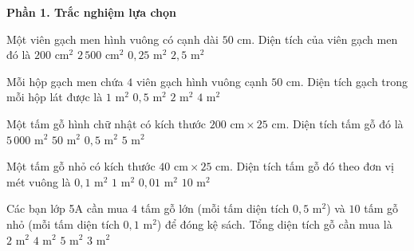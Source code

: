 \textbf{Phần 1. Trắc nghiệm lựa chọn}

\begin{ex} %
Một viên gạch men hình vuông có cạnh dài $50\text{ cm}$. Diện tích của viên gạch men đó là
\choice
{$200\text{ cm}^2$}
{$2\,500\text{ cm}^2$}
{\True $0{,}25\text{ m}^2$}
{$2{,}5\text{ m}^2$}
\end{ex}

\begin{ex} %
Mỗi hộp gạch men chứa $4$ viên gạch hình vuông cạnh $50\text{ cm}$. Diện tích gạch trong mỗi hộp lát được là
\choice
{\True $1\text{ m}^2$}
{$0{,}5\text{ m}^2$}
{$2\text{ m}^2$}
{$4\text{ m}^2$}
\end{ex}

\begin{ex} %
Một tấm gỗ hình chữ nhật có kích thước $200\text{ cm} \times 25\text{ cm}$. Diện tích tấm gỗ đó là
\choice
{$5\,000\text{ m}^2$}
{$50\text{ m}^2$}
{\True $0{,}5\text{ m}^2$}
{$5\text{ m}^2$}
\end{ex}

\begin{ex} %
Một tấm gỗ nhỏ có kích thước $40\text{ cm} \times 25\text{ cm}$. Diện tích tấm gỗ đó theo đơn vị mét vuông là
\choice
{\True $0{,}1\text{ m}^2$}
{$1\text{ m}^2$}
{$0{,}01\text{ m}^2$}
{$10\text{ m}^2$}
\end{ex}

\begin{ex} %
Các bạn lớp 5A cần mua $4$ tấm gỗ lớn (mỗi tấm diện tích $0{,}5\text{ m}^2$) và $10$ tấm gỗ nhỏ (mỗi tấm diện tích $0{,}1\text{ m}^2$) để đóng kệ sách. Tổng diện tích gỗ cần mua là
\choice
{$2\text{ m}^2$}
{$4\text{ m}^2$}
{$5\text{ m}^2$}
{\True $3\text{ m}^2$}
\end{ex}

